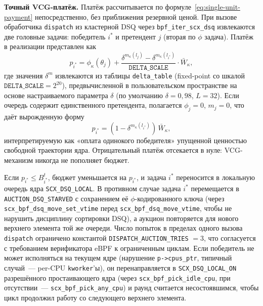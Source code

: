 \documentclass[14pt, oneside]{extbook}
\begin{document}
        \textbf{Точный VCG-платёж.}
        Платёж рассчитывается по
        формуле~\eqref{eq:single-unit-payment} непосредственно,
        без приближения резервной ценой. При вызове обработчика
        \texttt{dispatch} из кластерной DSQ через
        \texttt{bpf\_iter\_scx\_dsq} извлекаются две головные
        задачи: победитель $i^*$ и претендент $j$ (вторая по
        $\phi$ задача). Платёж в реализации представлен как
        \[
                p_{i^*} = \phi_\kappa(\theta_j) +
                \frac{\delta^{m_\kappa(l_j)} -
                \delta^{m_\kappa(l_{i^*})}}
                {\texttt{DELTA\_SCALE}} \cdot \bar W_\kappa,
        \]
        где значения $\delta^m$ извлекаются из таблицы
        \texttt{delta\_table} (fixed-point со шкалой
        $\texttt{DELTA\_SCALE} = 2^{20}$), предвычисленной в
        пользовательском пространстве на основе настраиваемого
        параметра $\delta$ (по умолчанию $\delta = 0{,}98$,
        $L = 32$). Если очередь содержит единственного
        претендента, полагается $\phi_j = 0$, $m_j = 0$, что даёт вырожденную форму
        \[
                p_{i^*} = (1 - \delta^{m_\kappa(l_{i^*})})\,
                \bar W_\kappa,
        \]
        интерпретируемую как «оплата одинокого победителя»
        упущенной ценностью свободной траектории ядра.
        Отрицательный платёж отсекается в нуле: VCG-механизм
        никогда не пополняет бюджет.

        Если $p_{i^*} \leq B_{i^*}^t$, бюджет уменьшается на
        $p_{i^*}$, и задача $i^*$ переносится в локальную
        очередь ядра \texttt{SCX\_DSQ\_LOCAL}. В противном
        случае задача $i^*$ перемещается в
        \texttt{AUCTION\_DSQ\_STARVED} с сохранением её
        $\phi$-кодированного ключа (через
        \texttt{scx\_bpf\_dsq\_move\_set\_vtime} перед
        \texttt{scx\_bpf\_dsq\_move\_vtime}, чтобы не нарушить
        дисциплину сортировки DSQ), а аукцион повторяется для
        нового верхнего элемента той же очереди. Число попыток
        в пределах одного вызова \texttt{dispatch} ограничено
        константой \texttt{DISPATCH\_AUCTION\_TRIES} $= 3$,
        что согласуется с требованием верификатора eBPF к
        ограниченным циклам. Если победитель не может
        исполняться на текущем ядре (нарушение
        \texttt{p->cpus\_ptr}, типичный случай~---
        per-CPU \texttt{kworker}'ы), он перенаправляется в
        \texttt{SCX\_DSQ\_LOCAL\_ON} разрешённого простаивающего
        ядра (через \texttt{scx\_bpf\_pick\_idle\_cpu}, при
        отсутствии~--- \texttt{scx\_bpf\_pick\_any\_cpu}) и
        раунд считается несостоявшимся, чтобы цикл продолжил
        работу со следующего верхнего элемента.
\end{document}
